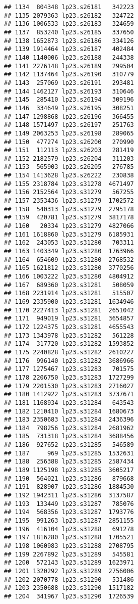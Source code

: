 \documentclass[
]{article}
\begin{document}
\begin{verbatim}
## 1134  804348 lp23.s26181   342223
## 1135 2079363 lp23.s26182   324722
## 1136 1006533 lp23.s26183   324659
## 1137  853240 lp23.s26185   337650
## 1138 1652873 lp23.s26186   334126
## 1139 1914464 lp23.s26187   402484
## 1140 1140006 lp23.s26188   244338
## 1141 2276148 lp23.s26189   299504
## 1142 1137464 lp23.s26190   310779
## 1143  257069 lp23.s26191   293481
## 1144 1462127 lp23.s26193   310646
## 1145  285410 lp23.s26194   309196
## 1146  334649 lp23.s26195   308251
## 1147 1298868 lp23.s26196   366455
## 1148 1571497 lp23.s26197   251763
## 1149 2063253 lp23.s26198   289065
## 1150  477274 lp23.s26200   270990
## 1151  112113 lp23.s26203   281419
## 1152 2182579 lp23.s26204   311203
## 1153  565903 lp23.s26205   276785
## 1154 1413628 lp23.s26222   230838
## 1155 2318784 lp23.s31278  4671497
## 1156 2152564 lp23.s31279   567255
## 1157 2353436 lp23.s31279  1702572
## 1158  540313 lp23.s31279  2795178
## 1159  420781 lp23.s31279  3817178
## 1160   20334 lp23.s31279  4827066
## 1161 1618860 lp23.s31279  6185931
## 1162  243053 lp23.s31280   703311
## 1163 1403349 lp23.s31280  1763966
## 1164  654609 lp23.s31280  2768532
## 1165 1621812 lp23.s31280  3770256
## 1166 1003222 lp23.s31280  4804912
## 1167  689360 lp23.s31281   508059
## 1168 2231914 lp23.s31281   515507
## 1169 2335900 lp23.s31281  1634946
## 1170 2227413 lp23.s31281  2651042
## 1171  949019 lp23.s31281  3654857
## 1172 1224375 lp23.s31281  4655543
## 1173 1343978 lp23.s31282   561228
## 1174  317720 lp23.s31282  1593852
## 1175 2240828 lp23.s31282  2610227
## 1176  996140 lp23.s31282  3686966
## 1177 1275467 lp23.s31283   701575
## 1178 2206750 lp23.s31283  1727299
## 1179 2201530 lp23.s31283  2716027
## 1180 1412922 lp23.s31283  3737671
## 1181 1168934 lp23.s31284   643543
## 1182 1210410 lp23.s31284  1680673
## 1183 2350683 lp23.s31284  2436396
## 1184  798256 lp23.s31284  2681962
## 1185  731318 lp23.s31284  3688456
## 1186  927652 lp23.s31285   546589
## 1187     969 lp23.s31285  1532631
## 1188  256388 lp23.s31285  2587434
## 1189 1125198 lp23.s31285  3605217
## 1190  564021 lp23.s31286   879668
## 1191  828907 lp23.s31286  1884530
## 1192 1942311 lp23.s31286  3137587
## 1193  133449 lp23.s31287   785076
## 1194  568356 lp23.s31287  1793776
## 1195  991263 lp23.s31287  2851155
## 1196  416104 lp23.s31288   691278
## 1197 1816280 lp23.s31288  1705521
## 1198 1060983 lp23.s31288  2708795
## 1199 2267892 lp23.s31289   545581
## 1200  572143 lp23.s31289  1623971
## 1201 1320292 lp23.s31289  2756006
## 1202 2070778 lp23.s31290   531486
## 1203 2350688 lp23.s31290  1517182
## 1204  341967 lp23.s31290  1726539

\end{verbatim}
\end{document}
